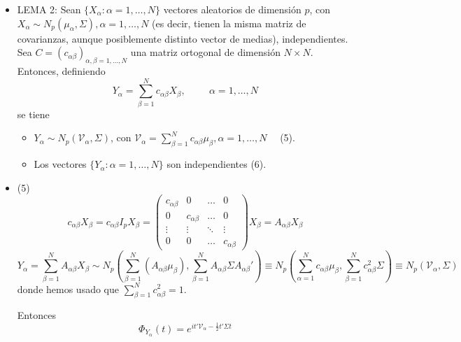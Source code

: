 \documentclass[11pt,a4paper]{article}
\begin{document}
\begin{itemize}
\item LEMA 2: Sean $\{X_{\alpha}: \alpha=1,\dots,N\}$ vectores aleatorios de dimensión $p$, con $X_{\alpha} \sim N_{p}(\mu_{\alpha}, \Sigma), \alpha = 1,\dots,N$ (es decir, tienen la misma matriz de covarianzas, aunque posiblemente distinto vector de medias), independientes. Sea $C = (c_{\alpha\beta})_{\alpha, \beta = 1,\dots,N}$ una matriz ortogonal de dimensión $N \times N$. Entonces, definiendo
$$Y_{\alpha} = \sum_{\beta=1}^{N} c_{\alpha\beta}X_{\beta}, \hspace{1cm} \alpha=1,\dots,N$$
se tiene
\begin{itemize}
\item $Y_{\alpha} \sim N_{p}(\mathcal{V}_{\alpha}, \Sigma)$, con $\mathcal{V}_{\alpha} = \sum_{\beta=1}^{N}c_{\alpha\beta}\mu_{\beta}, \alpha = 1, \dots, N \quad$ (5).
\item Los vectores $\{Y_{\alpha}: \alpha=1,\dots,N\}$ son independientes (6).
\end{itemize}

\item (5) $$c_{\alpha\beta} X_{\beta} = c_{\alpha\beta} I_{p} X_{\beta} = \begin{pmatrix}
c_{\alpha\beta} & 0 & \dots & 0 \\
0 & c_{\alpha\beta} & \dots & 0 \\
\vdots & \vdots & \ddots & \vdots \\
0 & 0 & \dots & c_{\alpha\beta}
\end{pmatrix} X_{\beta} = A_{\alpha\beta} X_{\beta}$$
$$Y_{\alpha} = \sum_{\beta=1}^{N} A_{\alpha\beta} X_{\beta} \sim N_{p}(\sum_{\beta=1}^{N}(A_{\alpha\beta}\mu_{\beta}), \sum_{\beta=1}^{N} A_{\alpha\beta} \Sigma A_{\alpha\beta}') \equiv N_{p}(\sum_{\alpha=1}^{N}c_{\alpha\beta} \mu_{\beta}, \sum_{\beta=1}^{N}c_{\alpha\beta}^{2}\Sigma) \equiv N_{p}(\mathcal{V}_{\alpha}, \Sigma)$$
donde hemos usado que $\sum_{\beta=1}^{N} c_{\alpha\beta}^{2}=1$.

Entonces
$$\Phi_{Y_{\alpha}}(t) = e^{it'\mathcal{V}_{\alpha} - \frac{1}{2}t' \Sigma t}$$


\end{itemize}
\end{document}
